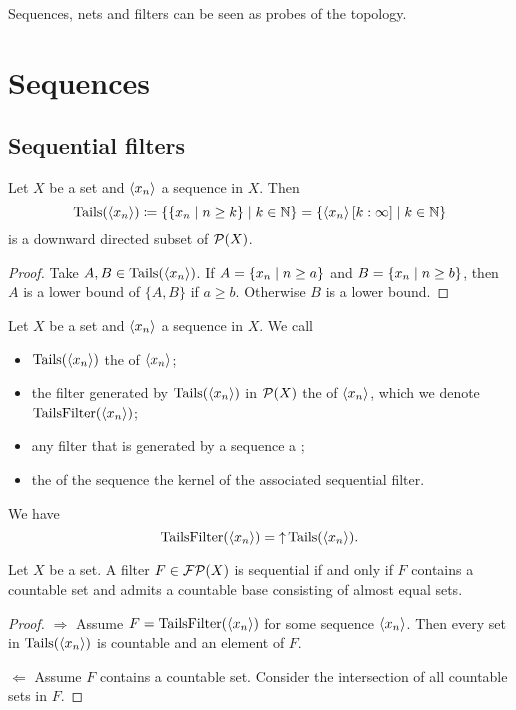 Sequences, nets and filters can be seen as probes of the topology.
\section{Sequences}
\subsection{Sequential filters}

\begin{lemma}
Let $X$ be a set and $\left\langle x_n \right\rangle$ a sequence in $X$. Then
\[ \operatorname{Tails}(\left\langle x_n \right\rangle) \coloneqq \left\{ \left\{ x_n \;\middle|\; n \geq k \right\} \;\middle|\; k\in \mathbb{N} \right\} = \left\{ \left\langle x_n \right\rangle[k:\infty] \;\middle|\; k\in \mathbb{N} \right\} \]
is a downward directed subset of $\operatorname{\mathcal{P}}(X)$.
\end{lemma}
\begin{proof}
Take $A,B\in \operatorname{Tails}(\left\langle x_n \right\rangle)$. If $A = \left\{ x_n \;\middle|\; n \geq a \right\}$ and $B = \left\{ x_n \;\middle|\; n \geq b \right\}$, then $A$ is a lower bound of $\{A,B\}$ if $a\geq b$. Otherwise $B$ is a lower bound.
\end{proof}

\begin{definition}
Let $X$ be a set and $\left\langle x_n \right\rangle$ a sequence in $X$. We call
\begin{itemize}
\item $\operatorname{Tails}(\left\langle x_n \right\rangle)$ the  of $\left\langle x_n \right\rangle$;
\item the filter generated by $\operatorname{Tails}(\left\langle x_n \right\rangle)$ in $\operatorname{\mathcal{P}}(X)$ the  of $\left\langle x_n \right\rangle$, which we denote $\operatorname{TailsFilter}(\left\langle x_n \right\rangle)$;
\item any filter that is generated by a sequence a ;
\item the  of the sequence the kernel of the associated sequential filter.
\end{itemize}
We have 
\[ \operatorname{TailsFilter}(\left\langle x_n \right\rangle) = \operatorname{\uparrow} \operatorname{Tails}(\left\langle x_n \right\rangle). \]
\end{definition}

\begin{proposition}
Let $X$ be a set. A filter $F\in \operatorname{\mathcal{FP}}(X)$ is sequential \textup{if and only if} $F$ contains a countable set and admits a countable base consisting of almost equal sets.
\end{proposition}
\begin{proof}
$\Rightarrow$ Assume $F = \operatorname{TailsFilter}(\left\langle x_n \right\rangle)$ for some sequence $\left\langle x_n \right\rangle$. Then every set in $\operatorname{Tails}(\left\langle x_n \right\rangle)$ is countable and an element of $F$.

$\Leftarrow$ Assume $F$ contains a countable set. Consider the intersection of all countable sets in $F$.
\end{proof}

